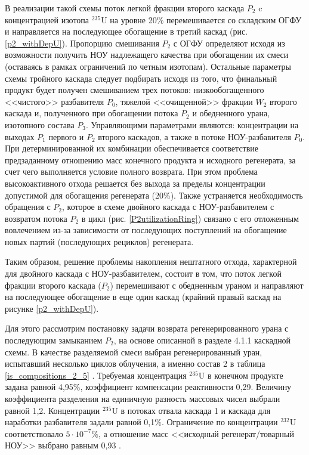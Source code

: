 В реализации такой схемы поток легкой фракции второго каскада $P_2$ c концентрацией изотопа $^{235}$U на уровне 20\% перемешивается со складским ОГФУ и направляется на последующее обогащение в третий каскад (рис. \ref{p2_withDepU}). Пропорцию смешивания $P_2$ с ОГФУ определяют исходя из возможности получить НОУ надлежащего качества при обогащении их смеси (оставаясь в рамках ограничений по четным изотопам). Остальные параметры схемы тройного каскада следует подбирать исходя из того, что финальный продукт будет получен смешиванием трех потоков: низкообогащенного <<чистого>> разбавителя $P_0$, тяжелой <<очищенной>> фракции $W_2$ второго каскада и, полученного при обогащении потока $P_2$ и обедненного урана, изотопного состава $P_3$. Управляющими параметрами являются: концентрации на выходах $P_1$ первого и $P_2$ второго каскадов, а также в потоке НОУ-разбавителя $P_0$. При детерминированной их комбинации обеспечивается соответствие предзаданному отношению масс конечного продукта и исходного регенерата, за счет чего выполняется условие полного возврата. При этом проблема высокоактивного отхода решается без выхода за пределы концентрации допустимой для обогащения регенерата (20\%). Также устраняется необходимость обращения с $P_2$, которое в схеме двойного каскада с НОУ-разбавителем с возвратом потока $P_2$ в цикл (рис. \ref{P2utilizationRing}) связано с его отложенным вовлечением из-за зависимости от последующих поступлений на обогащение новых партий (последующих рециклов) регенерата.

Таким образом, решение проблемы накопления нештатного отхода, характерной для двойного каскада с НОУ-разбавителем, состоит в том, что поток легкой фракции второго каскада ($P_2$) перемешивают с обедненным ураном и направляют на последующее обогащение в еще один каскад (крайний правый каскад на рисунке \ref{p2_withDepU}).


Для этого рассмотрим постановку задачи возврата регенерированного урана с последующим замыканием $P_2$, на основе описанной в разделе 4.1.1 каскадной схемы. В качестве разделяемой смеси выбран регенерированный уран, испытавший несколько циклов облучения, а именно состав 2 в таблица \ref{is_compositions_2_5} \cite{smirnovObogashchenieRegenerirovannogoUrana2018}. Требуемая концентрация $^{235}$U в конечном продукте задана равной 4,95\%, коэффициент компенсации реактивности 0,29. Величину коэффициента разделения на единичную разность массовых чисел выбрали равной 1,2. Концентрации $^{235}$U в потоках отвала каскада 1 и каскада для наработки разбавителя задали равной 0,1\%. Ограничение по концентрации $^{232}$U соответствовало $5\cdot10^{-7} \%$, а отношение масс <<исходный регенерат/товарный НОУ>> выбрано равным 0,93 \cite{smirnovObogashchenieRegenerirovannogoUrana2018}.



